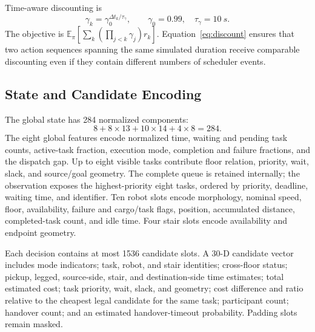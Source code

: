 \documentclass[journal]{IEEEtran}
\begin{document}
Time-aware discounting is
\begin{equation}
  \gamma_k=\gamma_0^{\Delta t_k/\tau_\gamma},
  \qquad \gamma_0=0.99,\quad \tau_\gamma=\SI{10}{s}.
  \label{eq:discount}
\end{equation}
The objective is $\mathbb{E}_{\pi}[\sum_k(\prod_{j<k}\gamma_j)r_k]$. Equation~\eqref{eq:discount} ensures that two action sequences spanning the same simulated duration receive comparable discounting even if they contain different numbers of scheduler events.

\subsection{State and Candidate Encoding}

The global state has 284 normalized components:
\begin{equation}
  8 + 8\times13 + 10\times14 + 4\times8 = 284.
\end{equation}
The eight global features encode normalized time, waiting and pending task counts, active-task fraction, execution mode, completion and failure fractions, and the dispatch gap. Up to eight visible tasks contribute floor relation, priority, wait, slack, and source/goal geometry. The complete queue is retained internally; the observation exposes the highest-priority eight tasks, ordered by priority, deadline, waiting time, and identifier. Ten robot slots encode morphology, nominal speed, floor, availability, failure and cargo/task flags, position, accumulated distance, completed-task count, and idle time. Four stair slots encode availability and endpoint geometry.

Each decision contains at most 1536 candidate slots. A 30-D candidate vector includes mode indicators; task, robot, and stair identities; cross-floor status; pickup, legged, source-side, stair, and destination-side time estimates; total estimated cost; task priority, wait, slack, and geometry; cost difference and ratio relative to the cheapest legal candidate for the same task; participant count; handover count; and an estimated handover-timeout probability. Padding slots remain masked.
\end{document}
